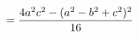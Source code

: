 \documentclass[preview]{standalone}
\begin{document}
\begin{align*}
\special{dvisvgm:raw <g id='unique000'>}= \frac{4a^2c^2 - (a^2-b^2+c^2)^2}{16}\special{dvisvgm:raw </g>}
\end{align*}
\end{document}
